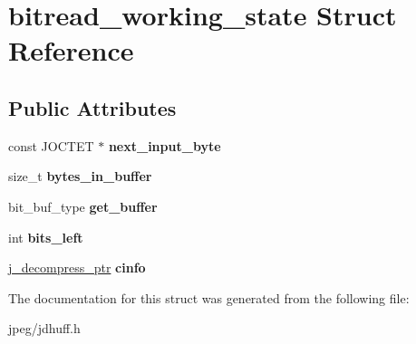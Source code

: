 \hypertarget{structbitread__working__state}{}\section{bitread\+\_\+working\+\_\+state Struct Reference}
\label{structbitread__working__state}
\subsection*{Public Attributes}
\begin{DoxyCompactItemize}
\item 
const J\+O\+C\+T\+ET $\ast$ {\bfseries next\+\_\+input\+\_\+byte}\hypertarget{structbitread__working__state_a663f17ba1c850439118605f1842b2fbf}{}\label{structbitread__working__state_a663f17ba1c850439118605f1842b2fbf}

\item 
size\+\_\+t {\bfseries bytes\+\_\+in\+\_\+buffer}\hypertarget{structbitread__working__state_a9564d55e83f5b154a50a84ffb4e45809}{}\label{structbitread__working__state_a9564d55e83f5b154a50a84ffb4e45809}

\item 
bit\+\_\+buf\+\_\+type {\bfseries get\+\_\+buffer}\hypertarget{structbitread__working__state_a1b14cadab00deca48688b336c6a48664}{}\label{structbitread__working__state_a1b14cadab00deca48688b336c6a48664}

\item 
int {\bfseries bits\+\_\+left}\hypertarget{structbitread__working__state_a3744bcf2fb8bc73560ea6e4d083cf6ff}{}\label{structbitread__working__state_a3744bcf2fb8bc73560ea6e4d083cf6ff}

\item 
\hyperlink{structjpeg__decompress__struct}{j\+\_\+decompress\+\_\+ptr} {\bfseries cinfo}\hypertarget{structbitread__working__state_ae6ed0f717c279eac7ac54cec32cfaa3e}{}\label{structbitread__working__state_ae6ed0f717c279eac7ac54cec32cfaa3e}

\end{DoxyCompactItemize}


The documentation for this struct was generated from the following file\+:\begin{DoxyCompactItemize}
\item 
jpeg/jdhuff.\+h\end{DoxyCompactItemize}
